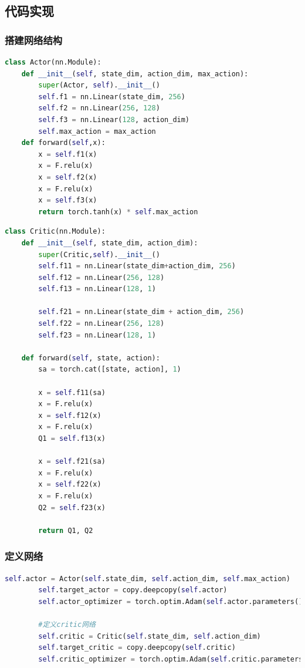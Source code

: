 \subsection{代码实现}


\subsubsection{搭建网络结构}

\begin{lstlisting}[language=Python]
class Actor(nn.Module):
    def __init__(self, state_dim, action_dim, max_action):
        super(Actor, self).__init__()
        self.f1 = nn.Linear(state_dim, 256)
        self.f2 = nn.Linear(256, 128)
        self.f3 = nn.Linear(128, action_dim)
        self.max_action = max_action
    def forward(self,x):
        x = self.f1(x)
        x = F.relu(x)
        x = self.f2(x)
        x = F.relu(x)
        x = self.f3(x)
        return torch.tanh(x) * self.max_action
\end{lstlisting}


\begin{lstlisting}[language=Python]
class Critic(nn.Module):
    def __init__(self, state_dim, action_dim):
        super(Critic,self).__init__()
        self.f11 = nn.Linear(state_dim+action_dim, 256)
        self.f12 = nn.Linear(256, 128)
        self.f13 = nn.Linear(128, 1)

        self.f21 = nn.Linear(state_dim + action_dim, 256)
        self.f22 = nn.Linear(256, 128)
        self.f23 = nn.Linear(128, 1)

    def forward(self, state, action):
        sa = torch.cat([state, action], 1)

        x = self.f11(sa)
        x = F.relu(x)
        x = self.f12(x)
        x = F.relu(x)
        Q1 = self.f13(x)

        x = self.f21(sa)
        x = F.relu(x)
        x = self.f22(x)
        x = F.relu(x)
        Q2 = self.f23(x)

        return Q1, Q2
\end{lstlisting}


\subsubsection{定义网络}


\begin{lstlisting}[language=Python]
self.actor = Actor(self.state_dim, self.action_dim, self.max_action)
        self.target_actor = copy.deepcopy(self.actor)
        self.actor_optimizer = torch.optim.Adam(self.actor.parameters(), lr=3e-4)

        #定义critic网络
        self.critic = Critic(self.state_dim, self.action_dim)
        self.target_critic = copy.deepcopy(self.critic)
        self.critic_optimizer = torch.optim.Adam(self.critic.parameters(), lr=3e-4)
\end{lstlisting}


